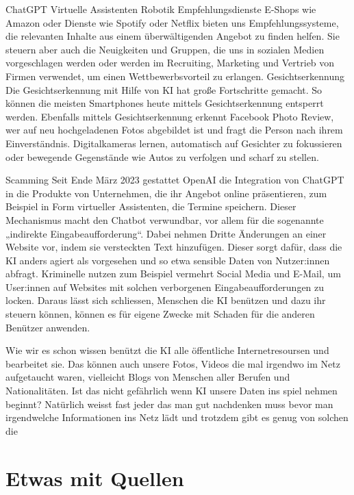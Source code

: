 \documentclass{report}
\begin{document}
   ChatGPT
   Virtuelle Assistenten
   Robotik
   Empfehlungsdienste
   E-Shops wie Amazon oder Dienste wie Spotify oder Netflix bieten uns Empfehlungssysteme, die relevanten Inhalte
    aus einem überwältigenden Angebot zu finden helfen. Sie steuern aber auch die Neuigkeiten und Gruppen,
 die uns in sozialen Medien vorgeschlagen werden oder werden im Recruiting, Marketing und Vertrieb von Firmen verwendet, 
 um einen Wettbewerbsvorteil zu erlangen.
 Gesichtserkennung
Die Gesichtserkennung mit Hilfe von KI hat große Fortschritte gemacht. 
So können die meisten Smartphones heute mittels Gesichtserkennung entsperrt werden. 
Ebenfalls mittels Gesichtserkennung erkennt Facebook Photo Review, wer auf neu hochgeladenen 
Fotos abgebildet ist und fragt die Person nach ihrem Einverständnis. Digitalkameras lernen, automatisch
 auf Gesichter zu fokussieren oder bewegende Gegenstände wie Autos zu verfolgen und scharf zu stellen.


 Scamming
 Seit Ende März 2023 gestattet OpenAI die Integration von ChatGPT in die Produkte von Unternehmen, 
 die ihr Angebot online präsentieren, zum Beispiel in Form virtueller Assistenten, die Termine speichern. 
 Dieser Mechanismus macht den Chatbot verwundbar, vor allem für die sogenannte „indirekte Eingabeaufforderung“.
 Dabei nehmen Dritte Änderungen an einer Website vor, indem sie versteckten Text hinzufügen. Dieser sorgt dafür,
dass die KI anders agiert als vorgesehen und so etwa sensible Daten von Nutzer:innen abfragt. Kriminelle nutzen 
zum Beispiel vermehrt Social Media und E-Mail, um User:innen auf Websites mit solchen verborgenen Eingabeaufforderungen zu locken.
Daraus lässt sich schliessen, Menschen die KI benützen und dazu ihr steuern können, können es für eigene Zwecke mit Schaden 
für die anderen Benützer anwenden. 

 Wie wir es schon wissen benützt die KI alle öffentliche Internetresoursen und bearbeitet sie. Das können auch unsere Fotos, Videos 
 die mal irgendwo im Netz aufgetaucht waren, vielleicht  Blogs von Menschen aller Berufen und Nationalitäten. 
Ist das nicht gefährlich wenn KI unsere Daten ins spiel nehmen beginnt? Natürlich weisst fast jeder das man gut nachdenken 
muss bevor man irgendwelche Informationen ins Netz lädt und trotzdem gibt es genug von solchen die 
 




\section{Etwas mit Quellen}
\end{document}
